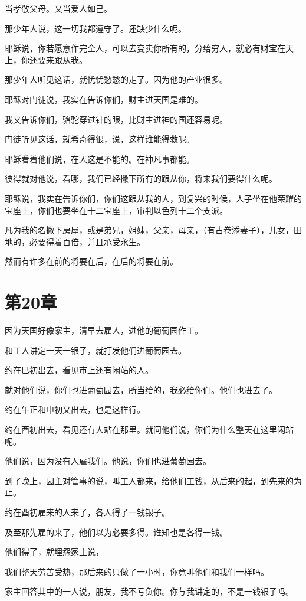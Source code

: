 \documentclass[12pt,oneside]{book}
\begin{document}
当孝敬父母。又当爱人如己。

那少年人说，这一切我都遵守了。还缺少什么呢。

耶稣说，你若愿意作完全人，可以去变卖你所有的，分给穷人，就必有财宝在天上，你还要来跟从我。

那少年人听见这话，就忧忧愁愁的走了。因为他的产业很多。

耶稣对门徒说，我实在告诉你们，财主进天国是难的。

我又告诉你们，骆驼穿过针的眼，比财主进神的国还容易呢。

门徒听见这话，就希奇得很，说，这样谁能得救呢。

耶稣看着他们说，在人这是不能的。在神凡事都能。

彼得就对他说，看哪，我们已经撇下所有的跟从你，将来我们要得什么呢。

耶稣说，我实在告诉你们，你们这跟从我的人，到复兴的时候，人子坐在他荣耀的宝座上，你们也要坐在十二宝座上，审判以色列十二个支派。

凡为我的名撇下房屋，或是弟兄，姐妹，父亲，母亲，（有古卷添妻子），儿女，田地的，必要得着百倍，并且承受永生。

然而有许多在前的将要在后，在后的将要在前。

\chapter{第20章}
因为天国好像家主，清早去雇人，进他的葡萄园作工。

和工人讲定一天一银子，就打发他们进葡萄园去。

约在巳初出去，看见市上还有闲站的人。

就对他们说，你们也进葡萄园去，所当给的，我必给你们。他们也进去了。

约在午正和申初又出去，也是这样行。

约在酉初出去，看见还有人站在那里。就问他们说，你们为什么整天在这里闲站呢。

他们说，因为没有人雇我们。他说，你们也进葡萄园去。

到了晚上，园主对管事的说，叫工人都来，给他们工钱，从后来的起，到先来的为止。

约在酉初雇来的人来了，各人得了一钱银子。

及至那先雇的来了，他们以为必要多得。谁知也是各得一钱。

他们得了，就埋怨家主说，

我们整天劳苦受热，那后来的只做了一小时，你竟叫他们和我们一样吗。

家主回答其中的一人说，朋友，我不亏负你。你与我讲定的，不是一钱银子吗。
\end{document}
